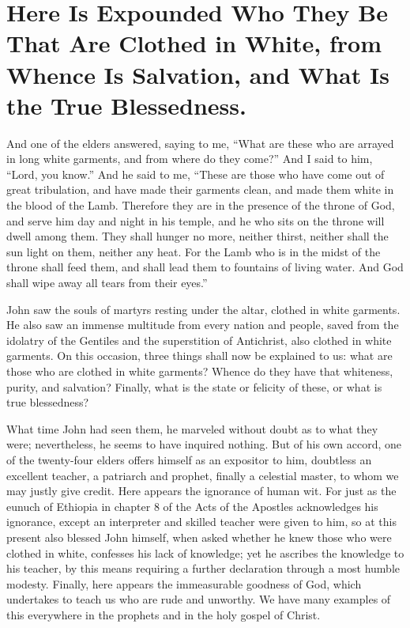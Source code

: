 \chapter[Sermon 36. Here Is Expounded Who They Be That Are Clothed in White, from Whence Is Salvation, and What Is the True Blessedness.]{Here Is Expounded Who They Be That Are Clothed in White, from Whence Is Salvation, and What Is the True Blessedness.}
\label{sermon:036}

And one of the elders answered, saying to me, “What are these who are arrayed in long white garments, and from where do they come?” And I said to him, “Lord, you know.” And he said to me, “These are those who have come out of great tribulation, and have made their garments clean, and made them white in the blood of the Lamb. Therefore they are in the presence of the throne of God, and serve him day and night in his temple, and he who sits on the throne will dwell among them. They shall hunger no more, neither thirst, neither shall the sun light on them, neither any heat. For the Lamb who is in the midst of the throne shall feed them, and shall lead them to fountains of living water. And God shall wipe away all tears from their eyes.”

John saw the souls of martyrs resting under the altar, clothed in white garments. He also saw an immense multitude from every nation and people, saved from the idolatry of the Gentiles and the superstition of Antichrist, also clothed in white garments. On this occasion, three things shall now be explained to us: what are those who are clothed in white garments? Whence do they have that whiteness, purity, and salvation? Finally, what is the state or felicity of these, or what is true blessedness?

What time John had seen them, he marveled without doubt as to what they were; nevertheless, he seems to have inquired nothing. But of his own accord, one of the twenty-four elders offers himself as an expositor to him, doubtless an excellent teacher, a patriarch and prophet, finally a celestial master, to whom we may justly give credit. Here appears the ignorance of human wit. For just as the eunuch of Ethiopia in chapter 8 of the Acts of the Apostles acknowledges his ignorance, except an interpreter and skilled teacher were given to him, so at this present also blessed John himself, when asked whether he knew those who were clothed in white, confesses his lack of knowledge; yet he ascribes the knowledge to his teacher, by this means requiring a further declaration through a most humble modesty. Finally, here appears the immeasurable goodness of God, which undertakes to teach us who are rude and unworthy. We have many examples of this everywhere in the prophets and in the holy gospel of Christ.

